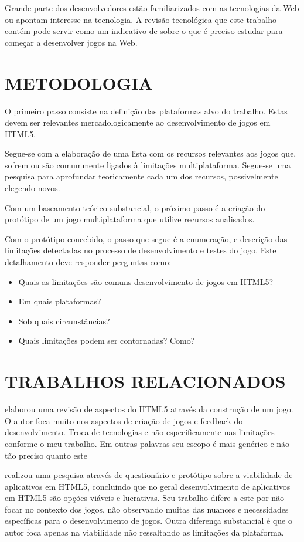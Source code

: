 Grande parte dos desenvolvedores estão familiarizados com as
tecnologias da Web ou apontam interesse na tecnologia. A revisão
tecnológica que este trabalho contém pode servir como um indicativo
de sobre o que é preciso estudar para começar a desenvolver jogos na
Web.

\section{METODOLOGIA}
\thispagestyle{myheadings}

O primeiro passo consiste na definição das plataformas alvo do trabalho.
Estas devem ser relevantes mercadologicamente ao desenvolvimento de
jogos em HTML5.

Segue-se com a elaboração de uma lista com os recursos relevantes
aos jogos que, sofrem ou são comummente ligados à
limitações multiplataforma. Segue-se uma pesquisa para aprofundar
teoricamente cada um dos recursos, possivelmente elegendo novos.

Com um baseamento teórico substancial, o próximo passo é a criação
do protótipo de um jogo multiplataforma que utilize recursos
analisados.

Com o protótipo concebido, o passo que segue é a enumeração, e
descrição das limitações detectadas no processo de desenvolvimento e
testes do jogo. Este detalhamento deve responder perguntas como:

\begin{itemize}
\item Quais as limitações são comuns desenvolvimento de jogos em HTML5?
\item Em quais plataformas?
\item Sob quais circunstâncias?
\item Quais limitações podem ser contornadas? Como?
\end{itemize}


\section{TRABALHOS RELACIONADOS}
\citet{crossPlatformMobileGame} elaborou uma revisão de aspectos do
HTML5 através da construção de um jogo. O autor foca muito nos
aspectos de criação de jogos e feedback do desenvolvimento. Troca
de tecnologias e não especificamente nas limitações conforme o meu
trabalho. Em outras palavras seu escopo é mais genérico e não tão
preciso quanto este

\citet{aSeriousContender} realizou uma pesquisa através de questionário
e protótipo sobre a viabilidade de aplicativos em HTML5, concluindo que
no geral desenvolvimento de aplicativos em HTML5 são opções viáveis
e lucrativas. Seu trabalho difere a este por não focar no contexto dos
jogos, não observando muitas das nuances e necessidades específicas
para o desenvolvimento de jogos. Outra diferença substancial é que o
autor foca apenas na viabilidade não ressaltando as limitações da
plataforma.

